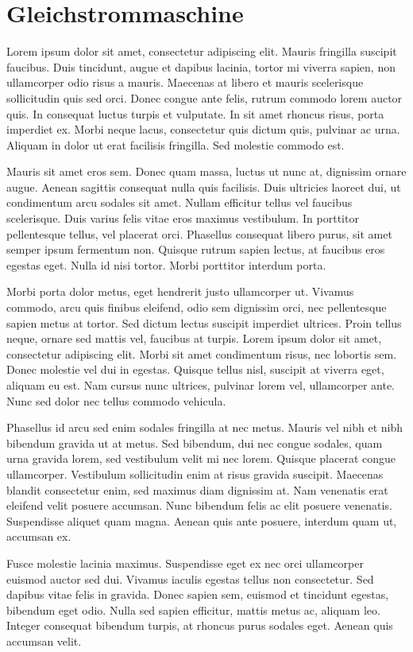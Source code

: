 \section{Gleichstrommaschine}
Lorem ipsum dolor sit amet, consectetur adipiscing elit. Mauris fringilla suscipit faucibus. Duis tincidunt, augue et dapibus lacinia, tortor mi viverra sapien, non ullamcorper odio risus a mauris. Maecenas at libero et mauris scelerisque sollicitudin quis sed orci. Donec congue ante felis, rutrum commodo lorem auctor quis. In consequat luctus turpis et vulputate. In sit amet rhoncus risus, porta imperdiet ex. Morbi neque lacus, consectetur quis dictum quis, pulvinar ac urna. Aliquam in dolor ut erat facilisis fringilla. Sed molestie commodo est.

Mauris sit amet eros sem. Donec quam massa, luctus ut nunc at, dignissim ornare augue. Aenean sagittis consequat nulla quis facilisis. Duis ultricies laoreet dui, ut condimentum arcu sodales sit amet. Nullam efficitur tellus vel faucibus scelerisque. Duis varius felis vitae eros maximus vestibulum. In porttitor pellentesque tellus, vel placerat orci. Phasellus consequat libero purus, sit amet semper ipsum fermentum non. Quisque rutrum sapien lectus, at faucibus eros egestas eget. Nulla id nisi tortor. Morbi porttitor interdum porta.

Morbi porta dolor metus, eget hendrerit justo ullamcorper ut. Vivamus commodo, arcu quis finibus eleifend, odio sem dignissim orci, nec pellentesque sapien metus at tortor. Sed dictum lectus suscipit imperdiet ultrices. Proin tellus neque, ornare sed mattis vel, faucibus at turpis. Lorem ipsum dolor sit amet, consectetur adipiscing elit. Morbi sit amet condimentum risus, nec lobortis sem. Donec molestie vel dui in egestas. Quisque tellus nisl, suscipit at viverra eget, aliquam eu est. Nam cursus nunc ultrices, pulvinar lorem vel, ullamcorper ante. Nunc sed dolor nec tellus commodo vehicula.

Phasellus id arcu sed enim sodales fringilla at nec metus. Mauris vel nibh et nibh bibendum gravida ut at metus. Sed bibendum, dui nec congue sodales, quam urna gravida lorem, sed vestibulum velit mi nec lorem. Quisque placerat congue ullamcorper. Vestibulum sollicitudin enim at risus gravida suscipit. Maecenas blandit consectetur enim, sed maximus diam dignissim at. Nam venenatis erat eleifend velit posuere accumsan. Nunc bibendum felis ac elit posuere venenatis. Suspendisse aliquet quam magna. Aenean quis ante posuere, interdum quam ut, accumsan ex.

Fusce molestie lacinia maximus. Suspendisse eget ex nec orci ullamcorper euismod auctor sed dui. Vivamus iaculis egestas tellus non consectetur. Sed dapibus vitae felis in gravida. Donec sapien sem, euismod et tincidunt egestas, bibendum eget odio. Nulla sed sapien efficitur, mattis metus ac, aliquam leo. Integer consequat bibendum turpis, at rhoncus purus sodales eget. Aenean quis accumsan velit.